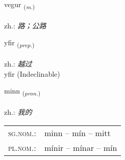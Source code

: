 \documentclass[frontgrid, backgrid]{flacards}\usepackage[]{graphicx}\usepackage[]{xcolor}
\begin{document}
{vegur \small{\textsubscript{(\textit{m.})}} \\[1ex] %
\textphonetic{[vɛːɣʏr]} \\
zh.: \emph{路；公路} \\  [2ex]
\renewcommand*{\arraystretch}{0.8}
}


\renewcommand{\flhead}{\vskip5pt \fboxsep=0pt {\small\bfseries\footnotesize Forsetning | 介词}}
\renewcommand{\fcfoot}{\vskip5pt \fboxsep=0pt \hspace{2pt}{\small\bfseries\footnotesize 1K}}

\renewcommand{\blhead}{\vskip5pt {\small\bfseries\footnotesize Forsetning | 介词 }}
\renewcommand{\bcfoot}{\vskip5pt \hspace{2pt}{\small\bfseries\footnotesize 1K}}


{yfir \small{\textsubscript{(\textit{prep.})}} \\[1ex]
\textphonetic{[ɪːvɪr]} \\
zh.: \emph{越过} \\  [2ex]
yfir (Indeclinable)}

\renewcommand{\flhead}{\vskip5pt \fboxsep=0pt {\small\bfseries\footnotesize Fornafn | 代词}}
\renewcommand{\fcfoot}{\vskip5pt \fboxsep=0pt \hspace{2pt}{\small\bfseries\footnotesize 1K}}

\renewcommand{\blhead}{\vskip5pt {\small\bfseries\footnotesize Fornafn | 代词 }}
\renewcommand{\bcfoot}{\vskip5pt \hspace{2pt}{\small\bfseries\footnotesize 1K}}


{minn \small{\textsubscript{(\textit{pron.})}} \\[1ex] %
\textphonetic{[mɪn]} \\
zh.: \emph{我的} \\  [2ex]
\renewcommand*{\arraystretch}{0.8}
\begin{tabular}{ll}
\textsc{sg.nom.}: & minn  --  mín -- mitt \\ 
\textsc{pl.nom.}: & mínir -- mínar -- mín
\end{tabular}
}
\end{document}
